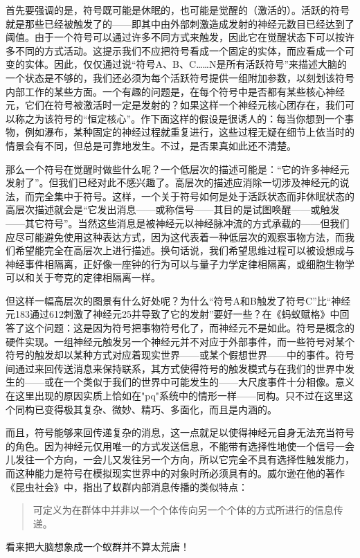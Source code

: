 首先要强调的是，符号既可能是休眠的，也可能是觉醒的（激活的）。活跃的符号就是那些已经被触发了的——即其中由外部刺激造成发射的神经元数目已经达到了阈值。由于一个符号可以通过许多不同方式来触发，因此它在觉醒状态下可以按许多不同的方式活动。这提示我们不应把符号看成一个固定的实体，而应看成一个可变的实体。因此，仅仅通过说“符号A、B、C……N是所有活跃符号”来描述大脑的一个状态是不够的，我们还必须为每个活跃符号提供一组附加参数，以刻划该符号内部工作的某些方面。一个有趣的问题是，在每个符号中是否都有某些核心神经元，它们在符号被激活时一定是发射的？如果这样一个神经元核心团存在，我们可以称之为该符号的“恒定核心”。作下面这样的假设是很诱人的：每当你想到一个事物，例如瀑布，某种固定的神经过程就重复进行，这些过程无疑在细节上依当时的情景会有不同，但总是可靠地发生。不过，是否果真如此还不清楚。

那么一个符号在觉醒时做些什么呢？一个低层次的描述可能是：“它的许多神经元发射了”。但我们已经对此不感兴趣了。高层次的描述应消除一切涉及神经元的说法，而完全集中于符号。这样，一个关于符号如何是处于活跃状态而非休眠状态的高层次描述就会是“它发出消息——或称信号——其目的是试图唤醒——或触发——其它符号”。当然这些消息是被神经元以神经脉冲流的方式承载的——但我们应尽可能避免使用这种表达方式，因为这代表着一种低层次的观察事物方法，而我们希望能完全在高层次上进行描述。换句话说，我们希望思维过程可以被设想成与神经事件相隔离，正好像一座钟的行为可以与量子力学定律相隔离，或细胞生物学可以和关于夸克的定律相隔离一样。

但这样一幅高层次的图景有什么好处呢？为什么“符号A和B触发了符号C”比“神经元183通过612刺激了神经元25并导致了它的发射”要好一些？在《蚂蚁赋格》中回答了这个问题：这是因为符号把事物符号化了，而神经元不是如此。符号是概念的硬件实现。一组神经元触发另一个神经元并不对应于外部事件，而一些符号对某个符号的触发却以某种方式对应着现实世界——或某个假想世界——中的事件。符号间通过来回传送消息来保持联系，其方式使得符号的触发模式与在我们的世界中发生的——或在一个类似于我们的世界中可能发生的——大尺度事件十分相像。意义在这里出现的原因实质上恰如在"pq"系统中的情形一样——同构。只不过在这里这个同构已变得极其复杂、微妙、精巧、多面化，而且是内涵的。

而且，符号能够来回传递复杂的消息，这一点就足以使得神经元自身无法充当符号的角色。因为神经元仅用唯一的方式发送信息，不能带有选择性地使一个信号一会儿发往一个方向，一会儿又发往另一个方向，所以它完全不具有选择性触发能力，而这种能力是符号在模拟现实世界中的对象时所必须具有的。威尔逊在他的著作《昆虫社会》中，指出了蚁群内部消息传播的类似特点：

\begin{quote}
可定义为在群体中并非以一个个体传向另一个个体的方式所进行的信息传递。
\end{quote}
看来把大脑想象成一个蚁群并不算太荒唐！

